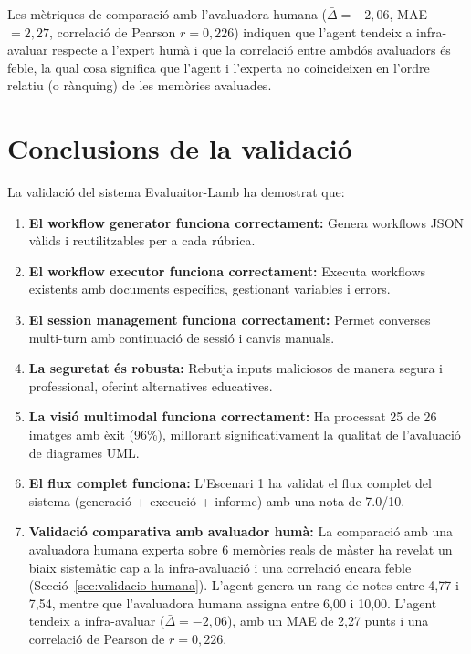 \documentclass[12pt,a4paper,twoside]{report}
\begin{document}
Les m\`etriques de comparaci\'o amb l'avaluadora humana ($\bar{\Delta} = -2,06$, MAE $= 2,27$, correlaci\'o de Pearson $r = 0,226$) indiquen que l'agent tendeix a infra-avaluar respecte a l'expert hum\`a i que la correlaci\'o entre ambd\'os avaluadors \'es feble, la qual cosa significa que l'agent i l'experta no coincideixen en l'ordre relatiu (o r\`anquing) de les mem\`ories avaluades.

\section{Conclusions de la validaci\'o}
\label{sec:conclusions-validacio}

La validaci\'o del sistema Evaluaitor-Lamb ha demostrat que:

\begin{enumerate}
    \item \textbf{El workflow generator funciona correctament:} Genera workflows JSON v\`alids i reutilitzables per a cada r\'ubrica.
    \item \textbf{El workflow executor funciona correctament:} Executa workflows existents amb documents espec\'ifics, gestionant variables i errors.
    \item \textbf{El session management funciona correctament:} Permet converses multi-turn amb continuaci\'o de sessi\'o i canvis manuals.
    \item \textbf{La seguretat \'es robusta:} Rebutja inputs maliciosos de manera segura i professional, oferint alternatives educatives.
    \item \textbf{La visi\'o multimodal funciona correctament:} Ha processat 25 de 26 imatges amb \`exit (96\%), millorant significativament la qualitat de l'avaluaci\'o de diagrames UML.
    \item \textbf{El flux complet funciona:} L'Escenari 1 ha validat el flux complet del sistema (generaci\'o + execuci\'o + informe) amb una nota de 7.0/10.
    \item \textbf{Validaci\'o comparativa amb avaluador hum\`a:} La comparaci\'o amb una avaluadora humana experta sobre 6 mem\`ories reals de m\`aster ha revelat un biaix sistem\`atic cap a la infra-avaluaci\'o i una correlaci\'o encara feble (Secci\'o~\ref{sec:validacio-humana}). L'agent genera un rang de notes entre 4,77 i 7,54, mentre que l'avaluadora humana assigna entre 6,00 i 10,00. L'agent tendeix a infra-avaluar ($\bar{\Delta} = -2,06$), amb un MAE de 2,27 punts i una correlaci\'o de Pearson de $r = 0,226$.
\end{enumerate}
\end{document}
